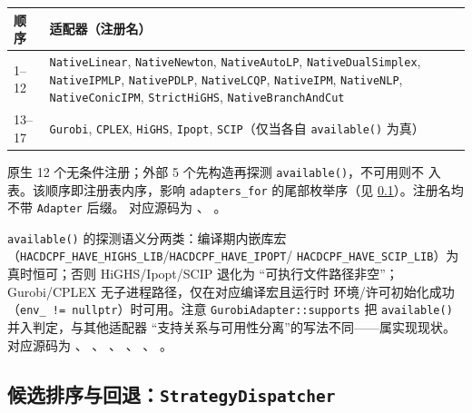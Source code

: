 \begin{center}
\small
\begin{tabular}{ll}
\toprule
顺序 & 适配器（注册名）\\
\midrule
1--12 & \texttt{NativeLinear}, \texttt{NativeNewton}, \texttt{NativeAutoLP},
        \texttt{NativeDualSimplex}, \texttt{NativeIPMLP}, \texttt{NativePDLP},
        \texttt{NativeLCQP}, \texttt{NativeIPM}, \texttt{NativeNLP},
        \texttt{NativeConicIPM}, \texttt{StrictHiGHS}, \texttt{NativeBranchAndCut}\\
13--17 & \texttt{Gurobi}, \texttt{CPLEX}, \texttt{HiGHS}, \texttt{Ipopt},
        \texttt{SCIP}\quad（仅当各自 \texttt{available()} 为真）\\
\bottomrule
\end{tabular}
\end{center}

原生 12 个无条件注册；外部 5 个先构造再探测 \texttt{available()}，不可用则不
入表。该顺序即注册表内序，影响 \texttt{adapters\_for} 的尾部枚举序（见
\ref{subsec:api-dispatch}）。注册名均不带 \texttt{Adapter} 后缀。
对应源码为
、
。

\texttt{available()} 的探测语义分两类：编译期内嵌库宏
（\texttt{HACDCPF\_HAVE\_HIGHS\_LIB}/\texttt{HACDCPF\_HAVE\_IPOPT}/%
\texttt{HACDCPF\_HAVE\_SCIP\_LIB}）为真时恒可；否则 HiGHS/Ipopt/SCIP 退化为
``可执行文件路径非空''；Gurobi/CPLEX 无子进程路径，仅在对应编译宏且运行时
环境/许可初始化成功（\texttt{env\_ != nullptr}）时可用。注意
\texttt{GurobiAdapter::supports} 把 \texttt{available()} 并入判定，与其他适配器
``支持关系与可用性分离''的写法不同——属实现现状。
对应源码为
、
、
、
、
、
。

\subsection{候选排序与回退：\texttt{StrategyDispatcher}}\label{subsec:api-dispatch}


